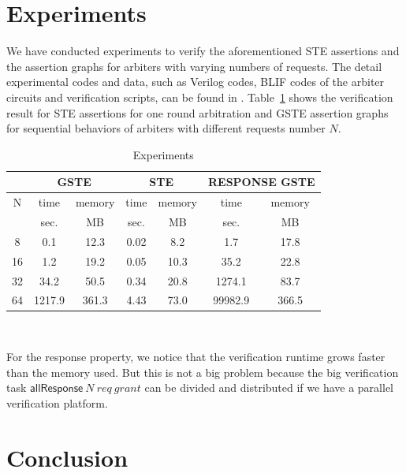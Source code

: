 \documentclass[final]{IEEEtran}
\begin{document}
\section{Experiments}\label{sec:experiments}

We have conducted experiments to verify the aforementioned STE assertions
and the assertion graphs for arbiters with varying numbers of
requests. The detail experimental codes and data, such as Verilog
codes, BLIF codes of the arbiter circuits and verification scripts,
can be found in \cite{Li11ArbiterExperiments}.
Table~\ref{steGsteExperiments} shows the verification result for STE
assertions for one round arbitration and GSTE assertion graphs for
sequential behaviors of arbiters with different requests number $N$.

\begin{table}
\caption{Experiments}
\label{steGsteExperiments}
\begin{tabular}{||c||c|c||c|c||c|c||}
\hline \hline
\multicolumn{1}{||c||}{ } & \multicolumn{2}{|c||}{GSTE} & \multicolumn{2}{|c||}{STE} & \multicolumn{2}{|c||}{RESPONSE GSTE} \\
\hline
N & time & memory & time & memory & time & memory\\
       & sec. & MB & sec. & MB & sec. & MB \\
\hline \hline
8 & 0.1 & 12.3 & 0.02 & 8.2 & 1.7 & 17.8\\
16 & 1.2 & 19.2 & 0.05 & 10.3 &35.2 & 22.8\\
32 & 34.2 & 50.5 & 0.34 & 20.8 &1274.1 & 83.7\\
64 & 1217.9 & 361.3 & 4.43 & 73.0 & 99982.9 & 366.5\\
\hline \hline
\end{tabular}\\
\end{table}
For the response property,  we notice that the verification runtime grows faster than the memory used. %
But this is not a big problem because the big verification task
$\mathsf{allResponse} \     N\ req\ grant$
can be divided and distributed if we have a parallel verification platform. %

\section{Conclusion}\label{sec:conclusion}
\end{document}
